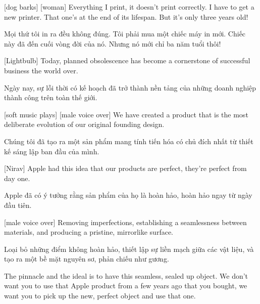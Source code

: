 \documentclass[a4paper]{article}
\begin{document}
	[dog barks]
	[woman] Everything I print, it doesn't print correctly.
	I have to get a new printer. That one's at the end of its lifespan.
	But it's only three years old!
	
	\begin{vietnamese-v2}
		 Mọi thứ tôi in ra đều không đúng. 
		Tôi phải mua một chiếc máy in mới. Chiếc này đã đến cuối vòng đời của nó. 
		Nhưng nó mới chỉ ba năm tuổi thôi!
	\end{vietnamese-v2}
	
	[Lightbulb] Today, planned obsolescence has become a cornerstone of successful business the world over.
	
	\begin{vietnamese-v2}
		 Ngày nay, sự lỗi thời có kế hoạch đã trở thành nền tảng của những doanh nghiệp thành công trên toàn thế giới.
	\end{vietnamese-v2}
	
	[soft music plays]
	[male voice over] We have created a product that is the most deliberate evolution of our original founding design.
	
	\begin{vietnamese-v2}
		 Chúng tôi đã tạo ra một sản phẩm mang tính tiến hóa có chủ đích nhất từ thiết kế sáng lập ban đầu của mình.
	\end{vietnamese-v2}
	
	[Nirav] Apple had this idea that our products are perfect, they're perfect from day one.
	
	\begin{vietnamese-v2}
		[Nirav] Apple đã có ý tưởng rằng sản phẩm của họ là hoàn hảo, hoàn hảo ngay từ ngày đầu tiên.
	\end{vietnamese-v2}
	
	[male voice over] Removing imperfections, establishing a seamlessness between materials, and producing a pristine, mirrorlike surface.

	\begin{vietnamese-v2}
		 Loại bỏ những điểm không hoàn hảo, thiết lập sự liền mạch giữa các vật liệu, và tạo ra một bề mặt nguyên sơ, phản chiếu như gương.
	\end{vietnamese-v2}

	The pinnacle and the ideal is to have this seamless, sealed up object.
	We don't want you to use that Apple product from a few years ago that you bought, we want you to pick up the new, perfect object and use that one.
\end{document}

